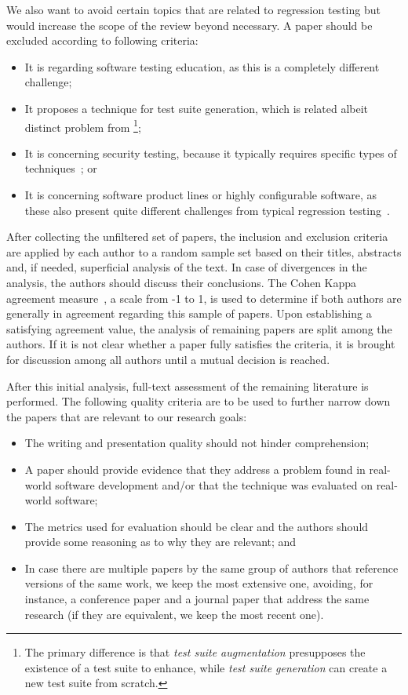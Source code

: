 We also want to avoid certain topics that are related to regression testing but would increase the scope of the review beyond necessary.
A paper should be excluded according to following criteria:
\begin{itemize}
    \item It is regarding software testing education, as this is a completely different challenge;
    \item It proposes a technique for test suite generation, which is related albeit distinct problem from \tsa \footnote{The primary difference is that \textit{test suite augmentation} presupposes the existence of a test suite to enhance, while \textit{test suite generation} can create a new test suite from scratch.};
    \item It is concerning security testing, because it typically requires specific types of techniques~\cite{FELDERER20161}; or
    \item It is concerning software product lines or highly configurable software, as these also present quite different challenges from typical regression testing~\cite{do2014strategies}.
\end{itemize}

After collecting the unfiltered set of papers, the inclusion and exclusion criteria are applied by each author to a random sample set based on their titles, abstracts and, if needed, superficial analysis of the text.
In case of divergences in the analysis, the authors should discuss their conclusions.
The Cohen Kappa agreement measure~\cite{cohen1960coefficient}, a scale from -1 to 1, is used to determine if both authors are generally in agreement regarding this sample of papers.
Upon establishing a satisfying agreement value, the analysis of remaining papers are split among the authors.
If it is not clear whether a paper fully satisfies the criteria, it is brought for discussion among all authors until a mutual decision is reached.

After this initial analysis, full-text assessment of the remaining literature is performed.
The following quality criteria are to be used to further narrow down the papers that are relevant to our research goals:
\begin{itemize}
	\item The writing and presentation quality should not hinder comprehension; 
    \item A paper should provide evidence that they address a problem found in real-world software development and/or that the technique was evaluated on real-world software;
    \item The metrics used for evaluation should be clear and the authors should provide some reasoning as to why they are relevant; and
    \item In case there are multiple papers by the same group of authors that reference versions of the same work, we keep the most extensive one, avoiding, for instance, a conference paper and a journal paper that address the same research (if they are equivalent, we keep the most recent one).
\end{itemize}

